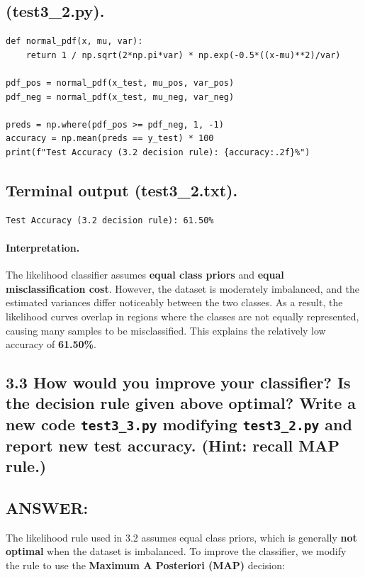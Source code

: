 \documentclass[12pt]{article}
\begin{document}
\subsection*{(test3\_2.py).}
\begin{lstlisting}
def normal_pdf(x, mu, var):
    return 1 / np.sqrt(2*np.pi*var) * np.exp(-0.5*((x-mu)**2)/var)

pdf_pos = normal_pdf(x_test, mu_pos, var_pos)
pdf_neg = normal_pdf(x_test, mu_neg, var_neg)

preds = np.where(pdf_pos >= pdf_neg, 1, -1)
accuracy = np.mean(preds == y_test) * 100
print(f"Test Accuracy (3.2 decision rule): {accuracy:.2f}%")
\end{lstlisting}

\subsection*{Terminal output (test3\_2.txt).}
\begin{lstlisting}
Test Accuracy (3.2 decision rule): 61.50%
\end{lstlisting}

\paragraph{Interpretation.}
The likelihood classifier assumes \textbf{equal class priors} and \textbf{equal misclassification cost}.
However, the dataset is moderately imbalanced, and the estimated variances differ noticeably
between the two classes. As a result, the likelihood curves overlap in regions where the classes
are not equally represented, causing many samples to be misclassified.  
This explains the relatively low accuracy of \textbf{61.50\%}.

\subsection*{3.3
How would you improve your classifier? Is the decision rule given above optimal? Write a new code 
\texttt{test3\_3.py} modifying 
\texttt{test3\_2.py} and report new test accuracy. (Hint: recall MAP rule.)}

\subsection*{ANSWER:}
The likelihood rule used in 3.2 assumes equal class priors, which is generally \textbf{not optimal}
when the dataset is imbalanced. To improve the classifier, we modify the rule to use the 
\textbf{Maximum A Posteriori (MAP)} decision:
\end{document}
